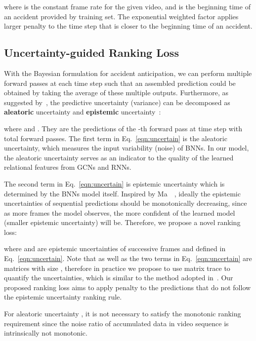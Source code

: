 \documentclass[sigconf]{acmart}
\begin{document}
where  is the constant frame rate for the given video, and  is the beginning time of an accident provided by training set. The exponential weighted factor applies larger penalty to the time step that is closer to the beginning time of an accident.


\subsection{Uncertainty-guided Ranking Loss}
\label{sec:rankloss}

With the Bayesian formulation for accident anticipation, we can perform multiple forward passes at each time step such that an assembled prediction could be obtained by taking the average of these multiple outputs. Furthermore, as suggested by~\cite{KendallNIPS2017}, the predictive uncertainty (variance) can be decomposed as \textbf{aleatoric} uncertainty and \textbf{epistemic} uncertainty~\cite{KwonMIDL2018,ShridharArXiv2018}:

where  and . They are the predictions of the -th forward pass at time step  with total  forward passes. The first term in Eq.~\ref{eqn:uncertain} is the aleatoric uncertainty, which measures the input variability (noise) of BNNs. In our model, the aleatoric uncertainty serves as an indicator to the quality of the learned relational features from GCNs and RNNs.

The second term in Eq.~\ref{eqn:uncertain} is epistemic uncertainty which is determined by the BNNs model itself. Inspired by Ma~\etal~\cite{MaCVPR2016}, ideally the epistemic uncertainties of sequential predictions should be monotonically decreasing, since as more frames the model observes, the more confident of the learned model (smaller epistemic uncertainty) will be. Therefore, we propose a novel ranking loss:

where  and  are epistemic uncertainties of successive frames  and  defined in Eq.~\ref{eqn:uncertain}. Note that  as well as the two terms in Eq.~\ref{eqn:uncertain} are matrices with size , therefore in practice we propose to use matrix trace to quantify the uncertainties, which is similar to the method adopted in~\cite{ShridharArXiv2018}. Our proposed ranking loss aims to apply penalty to the predictions that do not follow the epistemic uncertainty ranking rule.

For aleatoric uncertainty , it is not necessary to satisfy the monotonic ranking requirement since the noise ratio of accumulated data in video sequence is intrinsically not monotonic.
\end{document}

